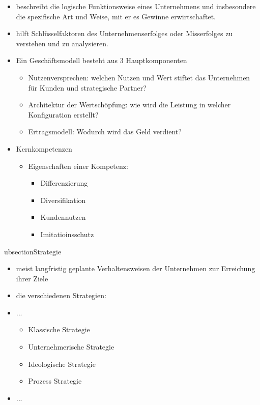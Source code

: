 \begin{itemize}
        \item beschreibt die logische Funktionsweise eines Unternehmens und insbesondere die spezifische Art und Weise, mit er es Gewinne erwirtschaftet.

        \item hilft Schlüsselfaktoren des Unternehmenserfolges oder Misserfolges zu verstehen und zu analysieren.

    \item Ein Geschäftsmodell besteht aus 3 Hauptkomponenten
    \begin{itemize}
        \item Nutzenversprechen: welchen Nutzen und Wert stiftet das Unternehmen für Kunden und strategische Partner?
        \item Architektur der Wertschöpfung: wie wird die Leistung in welcher Konfiguration erstellt?
        \item Ertragsmodell: Wodurch wird das Geld verdient?
    \end{itemize}


    \item Kernkompetenzen
    \begin{itemize}
        \item Eigenschaften einer Kompetenz:

        \begin{itemize}
            \item Differenzierung
            \item Diversifikation
            \item Kundennutzen
            \item Imitatioinsschutz
        \end{itemize}
    \end{itemize}


\end{itemize}



ubsection{Strategie}


\begin{itemize}
    \item meist langfristig geplante Verhaltensweisen der Unternehmen zur Erreichung ihrer Ziele
        \item die verschiedenen Strategien:
    \item ...
    \begin{itemize}
        \item Klassische Strategie
        \item Unternehmerische Strategie
        \item Ideologische Strategie
        \item Prozess Strategie
        \end{itemize}

    \item ...

\end{itemize}



